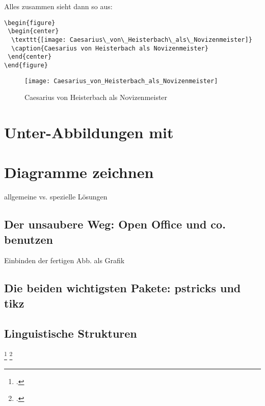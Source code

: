 Alles zusammen sieht dann so aus:

\begin{lstlisting}
\begin{figure}
 \begin{center}
  \texttt{[image: Caesarius\_von\_Heisterbach\_als\_Novizenmeister]}
  \caption{Caesarius von Heisterbach als Novizenmeister}
 \end{center}
\end{figure} 
\end{lstlisting}


\begin{figure}[!htb]
\centering
  \texttt{[image: Caesarius\_von\_Heisterbach\_als\_Novizenmeister]}
  \caption{Caesarius von Heisterbach als Novizenmeister}
\end{figure}

\section{Unter-Abbildungen mit \protect{}}


\section{Diagramme zeichnen}
allgemeine vs. spezielle Lösungen

\subsection{Der unsaubere Weg: Open Office und co. benutzen}

Einbinden der fertigen Abb. als Grafik


\subsection{Die beiden wichtigsten Pakete: pstricks und tikz}



\subsection{Linguistische Strukturen}
  
\footcite{roemer:dtk2008}
\footcite{roemer:dtk2016}


 


